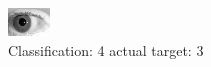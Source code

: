 \begin{figure}[h!]
\begin{center}
\includegraphics[width=0.60\columnwidth]{figures/ID182_class_4_target_3.png}
\end{center}
\caption{ Classification: 4 actual target: 3}
\label{fig:ID182_class_4_target_3}
\end{figure}
